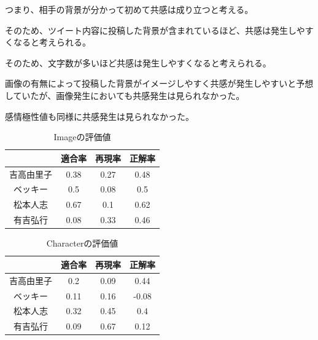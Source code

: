 \documentclass[dvipdfmx]{issj}
\begin{document}
つまり、相手の背景が分かって初めて共感は成り立つと考える。

そのため、ツイート内容に投稿した背景が含まれているほど、共感は発生しやすくなると考えられる。

そのため、文字数が多いほど共感は発生しやすくなると考えられる。


画像の有無によって投稿した背景がイメージしやすく共感が発生しやすいと予想していたが、画像発生においても共感発生は見られなかった。



感情極性値も同様に共感発生は見られなかった。

\begin{table}[htb]
  \begin{center}
    \caption{Imageの評価値}
    \begin{tabular}{c|ccc} \hline \hline
& 適合率 & 再現率 & 正解率 \\ \hline \hline
吉高由里子 &0.38&0.27&0.48 \\ \hline
ベッキー &0.5&0.08&0.5\\ \hline
松本人志 &0.67&0.1&0.62 \\ \hline
有吉弘行 & 0.08&0.33&0.46 \\ \hline
    \end{tabular}
    \label{tab:tripcode_user}
  \end{center}
\end{table}


\begin{table}[htb]
  \begin{center}
    \caption{Characterの評価値}
    \begin{tabular}{c|ccc} \hline \hline
& 適合率 & 再現率 & 正解率 \\ \hline \hline
吉高由里子 &0.2&0.09&0.44 \\ \hline
ベッキー &0.11&0.16&-0.08\\ \hline
松本人志 &0.32&0.45&0.4\\ \hline
有吉弘行 & 0.09&0.67&0.12 \\ \hline
    \end{tabular}
    \label{tab:tripcode_user}
  \end{center}
\end{table}
\end{document}

